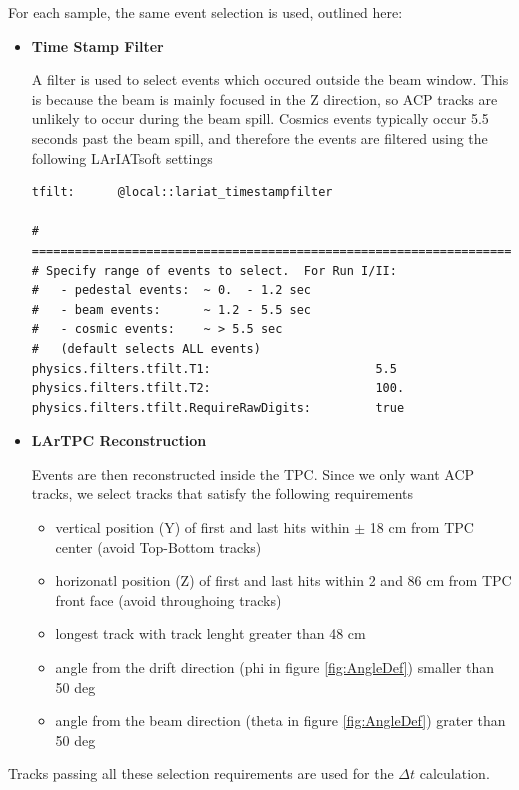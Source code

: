 For each sample, the same event selection is used, outlined here:
\begin{itemize}
\item \textbf{Time Stamp Filter}

A filter is used to select events which occured outside the beam window. This is because the beam is mainly focused in the Z direction, so ACP tracks are unlikely to occur during the beam spill. Cosmics events typically occur 5.5 seconds past the beam spill, and therefore the events are filtered using the following LArIATsoft settings

\begin{verbatim}
tfilt:      @local::lariat_timestampfilter

# ====================================================================
# Specify range of events to select.  For Run I/II:
#   - pedestal events:  ~ 0.  - 1.2 sec
#   - beam events:      ~ 1.2 - 5.5 sec
#   - cosmic events:    ~ > 5.5 sec
#   (default selects ALL events)
physics.filters.tfilt.T1:                       5.5
physics.filters.tfilt.T2:                       100.
physics.filters.tfilt.RequireRawDigits:         true

\end{verbatim}


\item \textbf{LArTPC Reconstruction}

Events are then reconstructed inside the TPC. Since we only want ACP tracks, we select tracks that satisfy the following requirements

\begin{itemize}
\item vertical position (Y) of first and last hits within $\pm$ 18 cm from TPC center (avoid Top-Bottom tracks) 
\item horizonatl position (Z) of first and last hits within 2 and 86 cm from TPC front face (avoid throughoing tracks) 
\item longest track with track lenght greater than 48 cm
\item angle from the drift direction (phi in figure \ref{fig:AngleDef}) smaller than 50 deg 
\item angle from the beam direction (theta in figure \ref{fig:AngleDef}) grater than 50 deg
\end{itemize}




\end{itemize}

Tracks passing all these selection requirements are used for the $\Delta t$ calculation.

